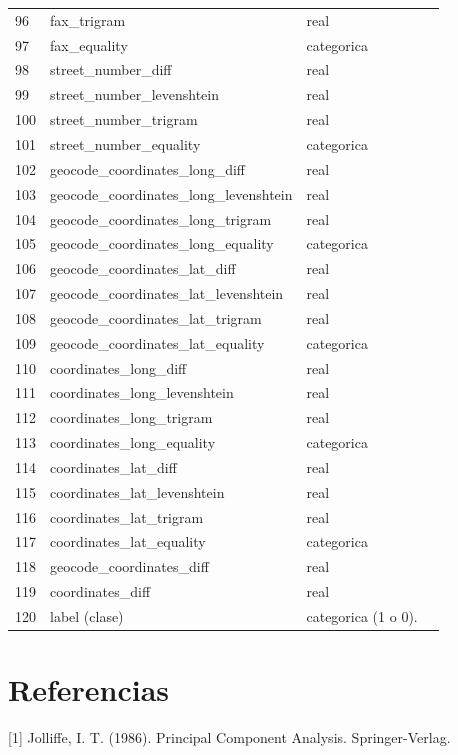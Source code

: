 \documentclass[journal]{IEEEtran}
\begin{document}
\begin{table}[ht!]
\begin{tabular}{l | l l l}
96	& fax\_trigram  &   real  \\
97	& fax\_equality  &    categorica   \\
98	& street\_number\_diff  &   real  \\
99	& street\_number\_levenshtein  &   real  \\
100	& street\_number\_trigram  &   real  \\
101	& street\_number\_equality  &    categorica   \\
102	& geocode\_coordinates\_long\_diff  &   real  \\
103	& geocode\_coordinates\_long\_levenshtein  &   real  \\
104	& geocode\_coordinates\_long\_trigram  &   real  \\
105	& geocode\_coordinates\_long\_equality  &    categorica   \\
106	& geocode\_coordinates\_lat\_diff  &   real  \\
107	& geocode\_coordinates\_lat\_levenshtein  &   real  \\
108	& geocode\_coordinates\_lat\_trigram  &   real  \\
109	& geocode\_coordinates\_lat\_equality  &    categorica   \\
110	& coordinates\_long\_diff  &   real  \\
111	& coordinates\_long\_levenshtein  &   real  \\
112	& coordinates\_long\_trigram  &   real  \\
113	& coordinates\_long\_equality  &    categorica   \\
114	& coordinates\_lat\_diff  &   real  \\
115	& coordinates\_lat\_levenshtein  &   real  \\
116	& coordinates\_lat\_trigram  &   real  \\
117	& coordinates\_lat\_equality  &    categorica   \\
118	& geocode\_coordinates\_diff  &   real  \\
119	& coordinates\_diff  &   real  \\
120	& label (clase) & categorica (1 o 0). \\
\end{tabular}
\end{table}

\section{Referencias}
\label{appendix2}
[1] Jolliffe, I. T. (1986). Principal Component Analysis. Springer-Verlag.
\end{document}
